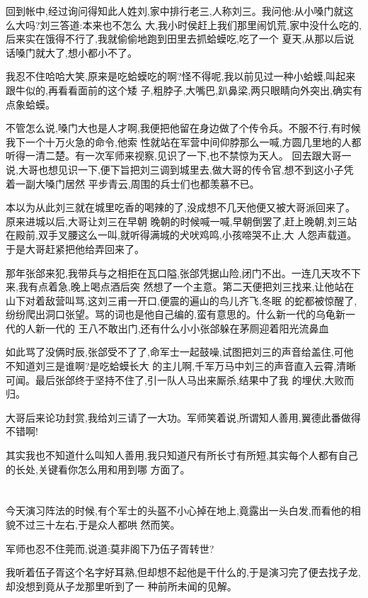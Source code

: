 ﻿\documentclass[12pt,twocolumn]{article}
\begin{document}
回到帐中,经过询问得知此人姓刘,家中排行老三,人称刘三。我问他:从小嗓门就这么大吗?刘三答道:本来也不怎么
大,我小时侯赶上我们那里闹饥荒,家中没什么吃的,后来实在饿得不行了,我就偷偷地跑到田里去抓蛤蟆吃,吃了一个
夏天,从那以后说话嗓门就大了,想小都小不了。

我忍不住哈哈大笑,原来是吃蛤蟆吃的啊?怪不得呢,我以前见过一种小蛤蟆,叫起来跟牛似的,再看看面前的这个矮
子,粗脖子,大嘴巴,趴鼻梁,两只眼睛向外突出,确实有点象蛤蟆。

不管怎么说,嗓门大也是人才啊,我便把他留在身边做了个传令兵。不服不行,有时候我下一个十万火急的命令,他索
性就站在军营中间仰脖那么一喊,方圆几里地的人都听得一清二楚。有一次军师来视察,见识了一下,也不禁惊为天人。
回去跟大哥一说,大哥也想见识一下,便下旨把刘三调到城里去,做大哥的传令官,想不到这小子凭着一副大嗓门居然
平步青云,周围的兵士们也都羡慕不已。

本以为从此刘三就在城里吃香的喝辣的了,没成想不几天他便又被大哥派回来了。原来进城以后,大哥让刘三在早朝
晚朝的时候喊一喊,早朝倒罢了,赶上晚朝,刘三站在殿前,双手叉腰这么一叫,就听得满城的犬吠鸡鸣,小孩啼哭不止,大
人怨声载道。于是大哥赶紧把他给弄回来了。

那年张郃来犯,我带兵与之相拒在瓦口隘,张郃凭据山险,闭门不出。一连几天攻不下来,我有点着急,晚上喝点酒后突
然想了一个主意。第二天便把刘三找来,让他站在山下对着敌营叫骂,这刘三甫一开口,便震的遍山的鸟儿齐飞,冬眠
的蛇都被惊醒了,纷纷爬出洞口张望。骂的词也是他自己编的,蛮有意思的。什么新一代的乌龟新一代的人新一代的
王八不敢出门,还有什么小小张郃躲在茅厕迎着阳光流鼻血\dldots

如此骂了没俩时辰,张郃受不了了,命军士一起鼓噪,试图把刘三的声音给盖住,可他不知道刘三是谁啊?是吃蛤蟆长大
的主儿啊,千军万马中刘三的声音直入云霄,清晰可闻。最后张郃终于坚持不住了,引一队人马出来厮杀,结果中了我
的埋伏,大败而归。

大哥后来论功封赏,我给刘三请了一大功。军师笑着说,所谓知人善用,翼德此番做得不错啊!

其实我也不知道什么叫知人善用,我只知道尺有所长寸有所短,其实每个人都有自己的长处,关键看你怎么用和用到哪
方面了。

\section{}

今天演习阵法的时候,有个军士的头盔不小心掉在地上,竟露出一头白发,而看他的相貌不过三十左右,于是众人都哄
然而笑。

军师也忍不住莞而,说道:莫非阁下乃伍子胥转世?

我听着伍子胥这个名字好耳熟,但却想不起他是干什么的,于是演习完了便去找子龙,却没想到竟从子龙那里听到了一
种前所未闻的见解。
\end{document}
